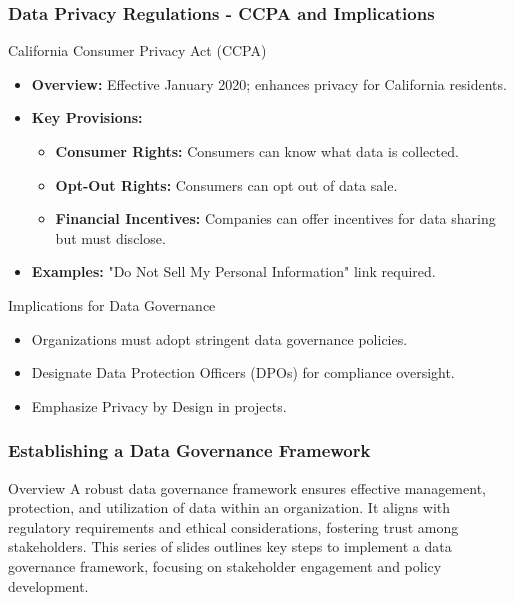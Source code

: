 \documentclass[aspectratio=169]{beamer}
\begin{document}
\begin{frame}[fragile]
    \frametitle{Data Privacy Regulations - CCPA and Implications}
    \begin{block}{California Consumer Privacy Act (CCPA)}
        \begin{itemize}
            \item \textbf{Overview:} Effective January 2020; enhances privacy for California residents.
            \item \textbf{Key Provisions:}
            \begin{itemize}
                \item \textbf{Consumer Rights:} Consumers can know what data is collected.
                \item \textbf{Opt-Out Rights:} Consumers can opt out of data sale.
                \item \textbf{Financial Incentives:} Companies can offer incentives for data sharing but must disclose.
            \end{itemize}
            \item \textbf{Examples:} "Do Not Sell My Personal Information" link required.
        \end{itemize}
    \end{block}
    \begin{block}{Implications for Data Governance}
        \begin{itemize}
            \item Organizations must adopt stringent data governance policies.
            \item Designate Data Protection Officers (DPOs) for compliance oversight.
            \item Emphasize Privacy by Design in projects.
        \end{itemize}
    \end{block}
\end{frame}

\begin{frame}[fragile]
    \frametitle{Establishing a Data Governance Framework}
    \begin{block}{Overview}
        A robust data governance framework ensures effective management, protection, and utilization of data within an organization. It aligns with regulatory requirements and ethical considerations, fostering trust among stakeholders. This series of slides outlines key steps to implement a data governance framework, focusing on stakeholder engagement and policy development.
    \end{block}
\end{frame}
\end{document}
